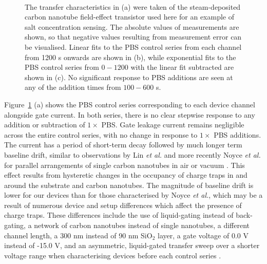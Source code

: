 \documentclass[
  a4paper,
]{scrbook}
\begin{document}
\begin{figure}
\begin{minipage}[t]{0.70\linewidth}
{{}

}

\subcaption{\label{fig-exp-fit}}
\end{minipage}%
%
\begin{minipage}[t]{0.15\linewidth}

{\centering 

~

}

\end{minipage}%

\caption{\label{fig-salt-conc-control-series}The transfer
characteristics in (a) were taken of the steam-deposited carbon nanotube
field-effect transistor used here for an example of salt concentration
sensing. The absolute values of measurements are shown, so that negative
values resulting from measurement error can be visualised. Linear fits
to the PBS control series from each channel from 1200 s onwards are
shown in (b), while exponential fits to the PBS control series from
\(0-1200\) with the linear fit subtracted are shown in (c). No
significant response to PBS additions are seen at any of the addition
times from \(100-600\) s.}

\end{figure}

Figure~\ref{fig-salt-conc-control-series} (a) shows the PBS control
series corresponding to each device channel alongside gate current. In
both series, there is no clear stepwise response to any addition or
subtraction of \(1 \times\) PBS. Gate leakage current remains negligible
across the entire control series, with no change in response to
\(1 \times\) PBS additions. The current has a period of short-term decay
followed by much longer term baseline drift, similar to observations by
Lin \emph{et al.} and more recently Noyce \emph{et al.} for parallel
arrangements of single carbon nanotubes in air or vacuum
\autocite{Lin2006,Noyce2019}. This effect results from hysteretic
changes in the occupancy of charge traps in and around the substrate and
carbon nanotubes. The magnitude of baseline drift is lower for our
devices than for those characterised by Noyce \emph{et al.}, which may
be a result of numerous device and setup differences which affect the
presence of charge traps. These differences include the use of
liquid-gating instead of back-gating, a network of carbon nanotubes
instead of single nanotubes, a different channel length, a 300 nm
instead of 90 nm SiO\(_2\) layer, a gate voltage of 0.0 V instead of
-15.0 V, and an asymmetric, liquid-gated transfer sweep over a shorter
voltage range when characterising devices before each control series
\autocite{Noyce2019}.
\end{document}
